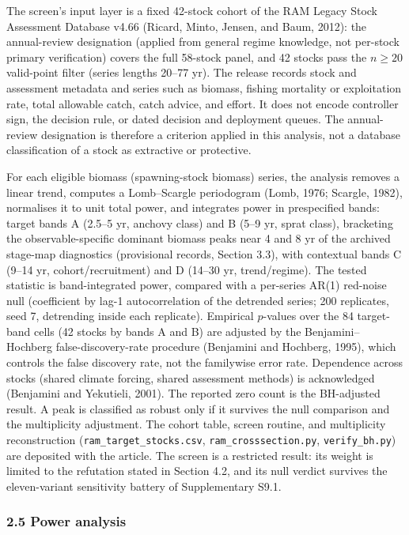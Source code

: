 \documentclass[11pt]{article}
\begin{document}
The screen's input layer is a fixed 42-stock cohort of the RAM Legacy
Stock Assessment Database v4.66 (Ricard, Minto, Jensen, and Baum, 2012): the annual-review designation (applied from general regime knowledge, not per-stock primary verification) covers the full 58-stock panel, and 42 stocks pass the \(n\ge 20\) valid-point filter (series lengths 20--77 yr). The release
records stock and assessment metadata and series such as biomass,
fishing mortality or exploitation rate, total allowable catch, catch
advice, and effort. It does not encode controller sign, the decision
rule, or dated decision and deployment queues. The annual-review
designation is therefore a criterion applied in this analysis, not a
database classification of a stock as extractive or protective.

For each eligible biomass (spawning-stock biomass) series, the analysis
removes a linear trend, computes a Lomb--Scargle periodogram (Lomb, 1976;
Scargle, 1982), normalises it to unit total power, and integrates power in
prespecified bands: target bands A (2.5--5 yr, anchovy class) and B (5--9 yr,
sprat class), bracketing the observable-specific dominant biomass peaks near 4 and
8 yr of the archived stage-map diagnostics (provisional records, Section 3.3), with contextual bands C (9--14 yr, cohort/recruitment) and D (14--30 yr, trend/regime). The tested
statistic is band-integrated power, compared with a per-series AR(1) red-noise
null (coefficient by lag-1 autocorrelation of the detrended series; 200 replicates, seed 7, detrending inside each replicate). Empirical
\(p\)-values over the 84 target-band cells (42 stocks by bands A and B) are
adjusted by the Benjamini--Hochberg false-discovery-rate procedure (Benjamini
and Hochberg, 1995), which controls the false discovery rate, not the
familywise error rate. Dependence across stocks (shared climate forcing,
shared assessment methods) is acknowledged (Benjamini and Yekutieli,
2001). The reported zero count is the
BH-adjusted result. A peak is classified as robust only if it survives the
null comparison and the multiplicity adjustment. The cohort table, screen
routine, and multiplicity reconstruction (\texttt{ram\_target\_stocks.csv},
\texttt{ram\_crosssection.py}, \texttt{verify\_bh.py}) are deposited with
the article. The screen is a restricted result: its weight is limited to
the refutation stated in Section 4.2, and its null verdict survives the
eleven-variant sensitivity battery of Supplementary S9.1.

\subsubsection{2.5 Power analysis}\label{power-analysis}
\end{document}
